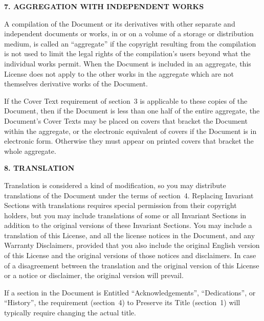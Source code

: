 \documentclass[11pt]{book}
\numberwithin{example}{chapter}
\begin{document}
\begin{center}
{\Large\bf 7. AGGREGATION WITH INDEPENDENT WORKS\par}

\end{center}


A compilation of the Document or its derivatives with other separate
and independent documents or works, in or on a volume of a storage or
distribution medium, is called an ``aggregate'' if the copyright
resulting from the compilation is not used to limit the legal rights
of the compilation's users beyond what the individual works permit.
When the Document is included in an aggregate, this License does not
apply to the other works in the aggregate which are not themselves
derivative works of the Document.

If the Cover Text requirement of section~3 is applicable to these
copies of the Document, then if the Document is less than one half of
the entire aggregate, the Document's Cover Texts may be placed on
covers that bracket the Document within the aggregate, or the
electronic equivalent of covers if the Document is in electronic form.
Otherwise they must appear on printed covers that bracket the whole
aggregate.


\begin{center}
{\Large\bf 8. TRANSLATION\par}

\end{center}


Translation is considered a kind of modification, so you may
distribute translations of the Document under the terms of section~4.
Replacing Invariant Sections with translations requires special
permission from their copyright holders, but you may include
translations of some or all Invariant Sections in addition to the
original versions of these Invariant Sections.  You may include a
translation of this License, and all the license notices in the
Document, and any Warranty Disclaimers, provided that you also include
the original English version of this License and the original versions
of those notices and disclaimers.  In case of a disagreement between
the translation and the original version of this License or a notice
or disclaimer, the original version will prevail.

If a section in the Document is Entitled ``Acknowledgements'',
``Dedications'', or ``History'', the requirement (section~4) to Preserve
its Title (section~1) will typically require changing the actual
title.
\end{document}
